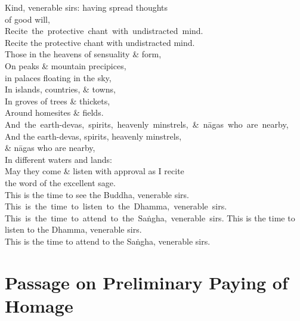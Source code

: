 \begin{leader-pharitvana-english}
  Kind, venerable sirs: having spread thoughts \ifninebythirteen \\ \else \fi of good will,\\
  \ifninebythirteen\mbox{Recite the protective chant with undistracted mind.}\\\else Recite the protective chant with undistracted mind.\\\fi
  Those in the heavens of sensuality \& form,\\
  On peaks \& mountain precipices,\ifninebythirteen\\\else\fi in palaces floating in the sky,\\
  In islands, countries, \& towns,\\
  In groves of trees \& thickets,\\
  Around homesites \& fields.\\
  \ifbfive\mbox{And the earth-devas, spirits, heavenly minstrels, \& nāgas who are nearby,}\\\else And the earth-devas, spirits, heavenly minstrels,\\ \& nāgas who are nearby,\\\fi
  In different waters and lands:\\
  May they come \& listen with approval as I recite\\ the word of the excellent sage.\\
\ifafive\clearpage\fi
  This is the time to see the Buddha, venerable sirs.\\
  \ifninebythirteen
  \mbox{This is the time to listen to the Dhamma, venerable sirs.}\\
  \mbox{This is the time to attend to the Saṅgha, venerable sirs.}
  \else
  This is the time to listen to the Dhamma, venerable sirs.\\
  This is the time to attend to the Saṅgha, venerable sirs.
  \fi
\end{leader-pharitvana-english}

\suttaRef{[Thai]}

\clearpage



\section{Passage on Preliminary Paying of Homage}
\label{passage-on-preliminary-paying-of-homage-protective}

